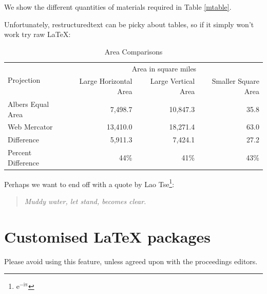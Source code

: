 \documentclass[letterpaper,compsoc,twoside,onecolumn]{IEEEtran}
\begin{document}
We show the different quantities of materials required in Table
\ref{mtable}.

Unfortunately, restructuredtext can be picky about tables, so if it
simply won't work try raw LaTeX:

\begin{longtable}{lrrr}
\caption{Area Comparisons \label{quanitities-table}}
\tabularnewline
\toprule
\multirow{2}{*}{Projection} & \multicolumn{3}{c}{Area in square miles}\tabularnewline

& Large Horizontal Area & Large Vertical Area & Smaller Square Area\tabularnewline
\hline
Albers Equal Area  & 7,498.7 & 10,847.3 & 35.8\tabularnewline
Web Mercator & 13,410.0 & 18,271.4 & 63.0\tabularnewline
Difference & 5,911.3 & 7,424.1 & 27.2\tabularnewline
Percent Difference & 44\% & 41\% & 43\%\tabularnewline
\bottomrule

\end{longtable}

Perhaps we want to end off with a quote by Lao Tse\footnote{\(\mathrm{e^{-i\pi}}\)}:

\begin{quote}
\emph{Muddy water, let stand, becomes clear.}
\end{quote}

\hypertarget{customised-latex-packages}{%
\section{Customised LaTeX packages}\label{customised-latex-packages}}

Please avoid using this feature, unless agreed upon with the proceedings
editors.



\end{document}
